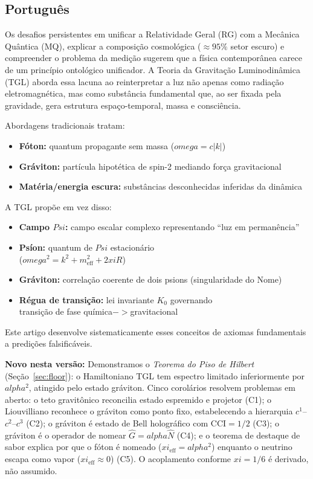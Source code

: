 \documentclass[12pt,a4paper]{article}
\def\Psi{Psi}%
\def\to{ -> }%
\def\alpha{alpha}%
\def\xi{xi}%
\def\omega{omega}%
\begin{document}
\subsection{Português}

Os desafios persistentes em unificar a Relatividade Geral (RG) com a Mecânica Quântica (MQ), explicar a composição cosmológica ($\approx 95\%$ setor escuro) e compreender o problema da medição sugerem que a física contemporânea carece de um princípio ontológico unificador. A Teoria da Gravitação Luminodinâmica (TGL) aborda essa lacuna ao reinterpretar a luz não apenas como radiação eletromagnética, mas como substância fundamental que, ao ser fixada pela gravidade, gera estrutura espaço-temporal, massa e consciência.

Abordagens tradicionais tratam:
\begin{itemize}
    \item \textbf{Fóton:} quantum propagante sem massa ($\omega = c|k|$)
    \item \textbf{Gráviton:} partícula hipotética de spin-2 mediando força gravitacional
    \item \textbf{Matéria/energia escura:} substâncias desconhecidas inferidas da dinâmica
\end{itemize}

A TGL propõe em vez disso:
\begin{itemize}
    \item \textbf{Campo $\Psi$:} campo escalar complexo representando ``luz em permanência''
    \item \textbf{Psíon:} quantum de $\Psi$ estacionário \\
    ($\omega^2 = k^2 + m_{\text{eff}}^2 + 2\xi R$)
    \item \textbf{Gráviton:} correlação coerente de dois psions (singularidade do Nome)
    \item \textbf{Régua de transição:} lei invariante $K_0$ governando \\
    transição de fase química$\to$gravitacional
\end{itemize}

Este artigo desenvolve sistematicamente esses conceitos de axiomas fundamentais a predições falsificáveis.

\textbf{Novo nesta versão:} Demonstramos o \emph{Teorema do Piso de Hilbert} (Seção~\ref{sec:floor}): o Hamiltoniano TGL tem espectro limitado inferiormente por $\alpha^2$, atingido pelo estado gráviton. Cinco corolários resolvem problemas em aberto: o teto gravitônico reconcilia estado espremido e projetor (C1); o Liouvilliano reconhece o gráviton como ponto fixo, estabelecendo a hierarquia $c^1$--$c^2$--$c^3$ (C2); o gráviton é estado de Bell holográfico com $\mathrm{CCI}=1/2$ (C3); o gráviton é o operador de nomear $\hat{G}=\alpha\hat{N}$ (C4); e o teorema de destaque de sabor explica por que o fóton é nomeado ($\xi_{\mathrm{eff}}=\alpha^2$) enquanto o neutrino escapa como vapor ($\xi_{\mathrm{eff}}\approx 0$) (C5). O acoplamento conforme $\xi=1/6$ é derivado, não assumido.
\end{document}

